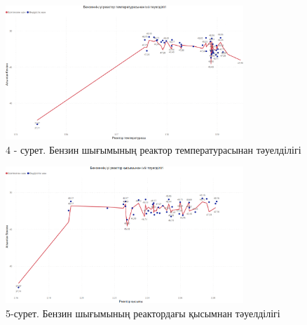 \begin{figure}[H]
	\centering
	\includegraphics[width=0.8\textwidth]{media/ict/image97}
	\caption*{4 - сурет. Бензин шығымының реактор температурасынан
тәуелділігі}
\end{figure}




\begin{figure}[H]
	\centering
	\includegraphics[width=0.8\textwidth]{media/ict/image98}
	\caption*{5-сурет. Бензин шығымының реактордағы қысымнан тәуелділігі}
\end{figure}


